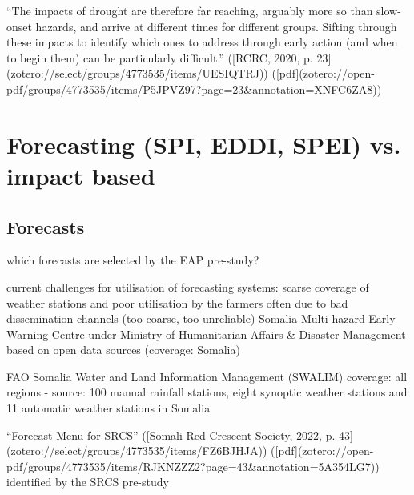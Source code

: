 {“The impacts of drought are therefore far reaching, arguably more so than slow-onset hazards, and arrive at different times for different groups. Sifting through these impacts to identify which ones to address through early action (and when to begin them) can be particularly difficult.” ([RCRC, 2020, p. 23](zotero://select/groups/4773535/items/UESIQTRJ)) ([pdf](zotero://open-pdf/groups/4773535/items/P5JPVZ97?page=23&annotation=XNFC6ZA8))



\section{Forecasting (SPI, EDDI, SPEI) vs. impact based}




\subsection{Forecasts}
which forecasts are selected by the EAP pre-study?

current challenges for utilisation of forecasting systems: scarse coverage of weather stations and poor utilisation by the farmers often due to bad dissemination channels  (too coarse, too unreliable)
Somalia Multi-hazard Early Warning Centre under Ministry of Humanitarian Affairs & Disaster Management
based on open data sources (coverage: Somalia)

FAO Somalia Water and Land Information Management (SWALIM) coverage: all regions - source: 100 manual rainfall stations, eight synoptic weather stations and 11 automatic weather stations in Somalia

“Forecast Menu for SRCS” ([Somali Red Crescent Society, 2022, p. 43](zotero://select/groups/4773535/items/FZ6BJHJA)) ([pdf](zotero://open-pdf/groups/4773535/items/RJKNZZZ2?page=43&annotation=5A354LG7))
identified by the SRCS pre-study

}

